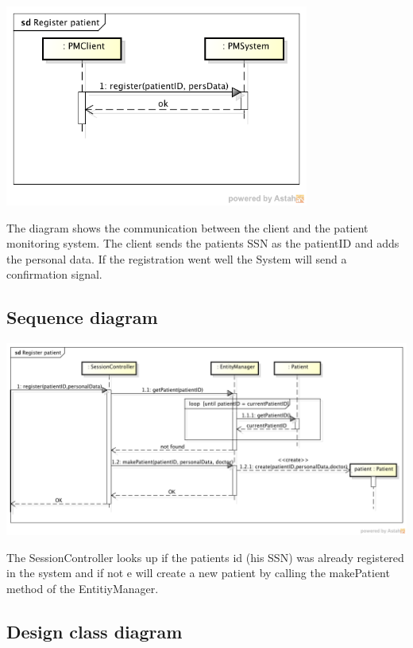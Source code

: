 \documentclass[fontsize=12pt,
               paper=a4,
               twoside=false,
               parskip=half,
               ]{scrartcl}
\begin{document}
\includegraphics[width=10cm]{./img/system-sequence-diagrams/register-patient.png}

The diagram shows the communication between the client and the patient monitoring system. The client sends the patients SSN as the patientID and adds the personal data. If the registration went well the System will send a confirmation signal.


\subsection{Sequence diagram}

\includegraphics[width=15cm]{./img/sequence-diagrams/register-patient.png}

The SessionController looks up if the patients id (his SSN) was already registered in the system and if not e will create a new patient by calling the makePatient method of the EntitiyManager.

\subsection{Design class diagram}
\end{document}
